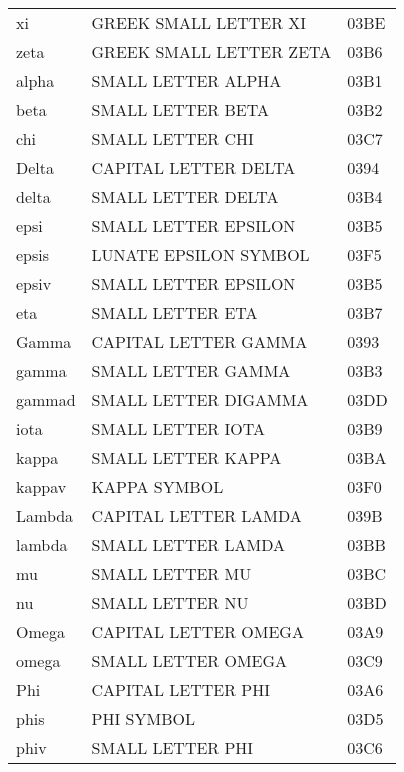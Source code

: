 \begin{longtable}{lll}
xi                 & GREEK SMALL LETTER XI               & 03BE\\
zeta               & GREEK SMALL LETTER ZETA             & 03B6\\
%
%
%
alpha              &  SMALL LETTER ALPHA            & 03B1\\
beta               &  SMALL LETTER BETA             & 03B2\\
chi                &  SMALL LETTER CHI              & 03C7\\
Delta              &  CAPITAL LETTER DELTA          & 0394\\
delta              &  SMALL LETTER DELTA            & 03B4\\
epsi               &  SMALL LETTER EPSILON          & 03B5\\
epsis              &  LUNATE EPSILON SYMBOL         & 03F5\\
epsiv              &  SMALL LETTER EPSILON          & 03B5\\
eta                &  SMALL LETTER ETA              & 03B7\\
Gamma              &  CAPITAL LETTER GAMMA          & 0393\\
gamma              &  SMALL LETTER GAMMA            & 03B3\\
gammad             &  SMALL LETTER DIGAMMA          & 03DD\\
iota               &  SMALL LETTER IOTA             & 03B9\\
kappa              &  SMALL LETTER KAPPA            & 03BA\\
kappav             &  KAPPA SYMBOL                  & 03F0\\
Lambda             &  CAPITAL LETTER LAMDA          & 039B\\
lambda             &  SMALL LETTER LAMDA            & 03BB\\
mu                 &  SMALL LETTER MU               & 03BC\\
nu                 &  SMALL LETTER NU               & 03BD\\
Omega              &  CAPITAL LETTER OMEGA          & 03A9\\
omega              &  SMALL LETTER OMEGA            & 03C9\\
Phi                &  CAPITAL LETTER PHI            & 03A6\\
phis               &  PHI SYMBOL                    & 03D5\\
phiv               &  SMALL LETTER PHI              & 03C6\\

\end{longtable}
